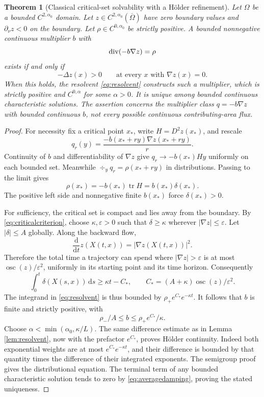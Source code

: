 \documentclass[11pt,a4paper]{article}
\newtheorem{theorem}{Theorem}[section]
\theoremstyle{definition}\newtheorem{definition}[theorem]{Definition}
\theoremstyle{remark}\newtheorem{remark}[theorem]{Remark}
\newcommand{\dd}{\,\mathrm d}
\newcommand{\cl}{\overline}
\begin{document}
\begin{theorem}[Classical critical-set solvability with a H\"older refinement]\label{thm:criticalcriterion}
Let $\Omega$ be a bounded $C^{2,\alpha_0}$ domain. Let $z\in C^{2,\alpha_0}(\cl\Omega)$ have zero boundary values and $\partial_\nu z<0$ on the boundary. Let $\rho\in C^{0,\alpha_0}$ be strictly positive. A bounded nonnegative continuous multiplier $b$ with
\[
 \operatorname{div}(-b\nabla z)=\rho
\]
exists if and only if
\begin{equation}
 -\Delta z(x)>0\qquad\text{at every }x\text{ with }\nabla z(x)=0.\label{eq:criticalcriterion}
\end{equation}
When this holds, the resolvent \eqref{eq:resolvent} constructs such a multiplier, which is strictly positive and $C^{0,\alpha}$ for some $\alpha>0$. It is unique among bounded continuous characteristic solutions. The assertion concerns the multiplier class $q=-b\nabla z$ with bounded continuous $b$, not every possible continuous contributing-area flux.
\end{theorem}
\begin{proof}
For necessity fix a critical point $x_*$, write $H=D^2z(x_*)$, and rescale
\[
 q_r(y)=\frac{-b(x_*+ry)\nabla z(x_*+ry)}r.
\]
Continuity of $b$ and differentiability of $\nabla z$ give $q_r\to-b(x_*)Hy$ uniformly on each bounded set. Meanwhile $\div_y q_r=\rho(x_*+ry)$ in distributions. Passing to the limit gives
\[
 \rho(x_*)=-b(x_*)\operatorname{tr}H=b(x_*)\delta(x_*).
\]
The positive left side and nonnegative finite $b(x_*)$ force $\delta(x_*)>0$.

For sufficiency, the critical set is compact and lies away from the boundary. By \eqref{eq:criticalcriterion}, choose $\kappa,\varepsilon>0$ such that $\delta\geq\kappa$ wherever $|\nabla z|\leq\varepsilon$. Let $|\delta|\leq A$ globally. Along the backward flow,
\[
 \frac{\mathrm d}{\mathrm dt}z(X(t,x))=|\nabla z(X(t,x))|^2.
\]
Therefore the total time a trajectory can spend where $|\nabla z|>\varepsilon$ is at most $\operatorname{osc}(z)/\varepsilon^2$, uniformly in its starting point and its time horizon. Consequently
\begin{equation}
 \int_0^t\delta(X(s,x))\dd s
 \geq\kappa t-C_*,\qquad
 C_*=(A+\kappa)\operatorname{osc}(z)/\varepsilon^2.\label{eq:averagedamping}
\end{equation}
The integrand in \eqref{eq:resolvent} is thus bounded by $\rho_+e^{C_*}e^{-\kappa t}$. It follows that $b$ is finite and strictly positive, with
\[
 \rho_-/A\leq b\leq\rho_+e^{C_*}/\kappa.
\]
Choose $\alpha<\min(\alpha_0,\kappa/L)$. The same difference estimate as in Lemma \ref{lem:resolvent}, now with the prefactor $e^{C_*}$, proves H\"older continuity. Indeed both exponential weights are at most $e^{C_*}e^{-\kappa t}$, and their difference is bounded by that quantity times the difference of their integrated exponents. The semigroup proof gives the distributional equation. The terminal term of any bounded characteristic solution tends to zero by \eqref{eq:averagedamping}, proving the stated uniqueness.
\end{proof}
\end{document}
